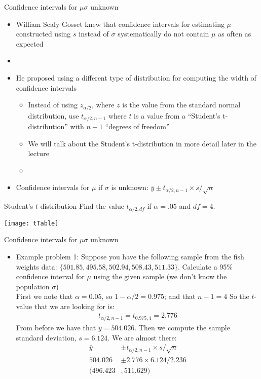 \documentclass[xcolor=dvipsnames]{beamer}
\begin{document}
\begin{frame}{Confidence intervals for $\mu$}{$\sigma$ unknown}
	\begin{itemize}
		\item William Sealy Gosset knew that confidence intervals for estimating $\mu$ constructed using $s$ instead of $\sigma$ systematically do not contain $\mu$ as often as expected  \pause
		\item[]
		\item He proposed using a different type of distribution for computing the width of confidence intervals  \pause
		\begin{itemize}
			\item Instead of using $z_{\alpha / 2}$, where $z$ is the value from the standard normal distribution, use $t_{\alpha / 2, n - 1}$ where $t$ is a value from a ``Student's t-distribution'' with $n-1$ ``degrees of freedom''  \pause
			\item We will talk about the Student's t-distribution in more detail later in the lecture
				\item[]  \pause
		\end{itemize}
			\item Confidence intervals for $\mu$ if $\sigma$ is unknown: $\bar{y} \pm t_{\alpha / 2, n - 1} \times s / \sqrt{n}$
	\end{itemize}
\end{frame}

\begin{frame}{Student's $t$-distribution}
	Find the value $t_{\alpha / 2, df}$ if $\alpha = .05$ and $df = 4$. 
	\begin{center}
		\texttt{[image: tTable]}
	\end{center}
\end{frame}

\begin{frame}{Confidence intervals for $\mu$}{$\sigma$ unknown}
	\begin{itemize}
		\item Example problem 1: Suppose you have the following sample from the fish weights data: $\{501.85, 495.58, 502.94, 508.43, 511.33\}$. Calculate a 95\% confidence interval for $\mu$ using the given sample (we don't know the population $\sigma$)  \pause \\
		\vspace{10 pt}
		First we note that $\alpha = 0.05$, so $1-\alpha / 2 = 0.975$; and that $n - 1 = 4$  \pause So the $t$-value that we are looking for is:
		\begin{gather*}
			t_{\alpha / 2, n - 1} = t_{0.975, 4} = 2.776
		\end{gather*}  \pause
		From before we have that $\bar{y}=504.026$. Then we compute the sample standard deviation, $s = 6.124$. We are almost there:  \pause
		\begin{align*}
			\bar{y} &\pm t_{\alpha / 2, n - 1} \times s / \sqrt{n} \\
			504.026 &\pm 2.776 \times 6.124 / 2.236 \\
			(496.423&, 511.629)
		\end{align*}
	\end{itemize}
\end{frame}
\end{document}
